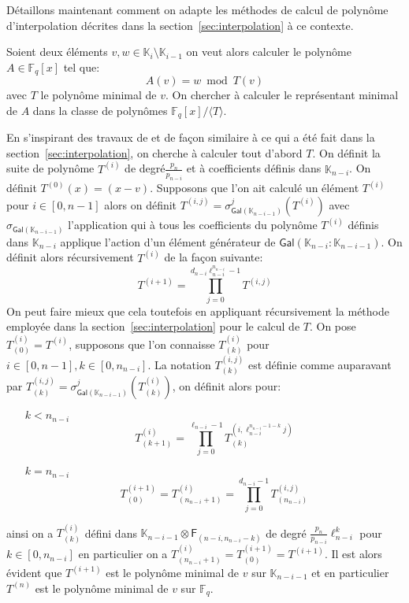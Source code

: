 \documentclass[10pt,a4paper]{book}
\theoremstyle{plain}
\theoremstyle{definition}
\theoremstyle{definition}
\theoremstyle{definition}
\theoremstyle{definition}
\theoremstyle{remark}
\theoremstyle{remark}
\theoremstyle{definition}
\begin{document}
Détaillons maintenant comment on adapte les méthodes de calcul de polynôme 
d'interpolation décrites dans la section~\ref{sec:interpolation} à ce contexte.
 
  
 Soient deux éléments $v,w \in \mathbb{K}_{i} \setminus \mathbb{K}_{i-1}$ on veut
 alors calculer le polynôme $A \in \mathbb{F}_q[x]$ tel que:
\begin{equation}
A(v)=w \bmod T(v)
\end{equation}
avec $T$ le polynôme minimal de $v$. On chercher à calculer le représentant 
minimal de $A$ dans la classe de polynômes $\mathbb{F}_q[x]/ \langle T \rangle$.

 
 En s'inspirant des travaux de \cite{DeFeo10} et de façon similaire à ce qui a 
 été fait dans la section~\ref{sec:interpolation}, on cherche à calculer tout 
 d'abord $T$. On définit la suite de polynôme $T^{(i)}$ de degré$\frac{p_n}{p_{n-i}}$ 
 et à coefficients définis dans $\mathbb{K}_{n-i}$. On définit $T^{(0)}(x)=(x-v)$. 
 Supposons que l'on ait calculé un élément $T^{(i)}$ pour $i \in [0,n-1]$ alors on définit 
 $T^{(i,j)}=\sigma^j_{\mathsf{Gal}(\mathbb{K}_{n-i-1})}(T^{(i)})$ avec
  $\sigma_{\mathsf{Gal}(\mathbb{K}_{n-i-1})}$ 
 l'application qui à tous les coefficients du polynôme $T^{(i)}$ définis dans 
 $\mathbb{K}_{n-i}$ applique l'action d'un élément générateur de 
 $\mathsf{Gal}(\mathbb{K}_{n-i}: \mathbb{K}_{n-i-1})$. 
 On définit alors récursivement $T^{(i)}$ de la façon suivante:
 \begin{equation*}
T^{(i+1)}=\prod_{j=0}^{d_{n-i}\ell_{n-i}^{n_{n-i}}-1}T^{(i,j)}    
\end{equation*}
On peut faire mieux que cela toutefois en appliquant récursivement la méthode 
employée dans la section~\ref{sec:interpolation} pour le calcul de $T$. On pose
$T^{(i)}_{(0)}=T^{(i)}$, supposons que l'on connaisse  $T^{(i)}_{(k)}$ pour 
$i \in [0,n-1], k \in [0,n_{n-i}]$. La notation $T^{(i,j)}_{(k)}$ est définie comme
 auparavant par $T^{(i,j)}_{(k)}=\sigma^j_{\mathsf{Gal}(\mathbb{K}_{n-i-1})}
 (T^{(i)}_{(k)})$, on définit alors pour:
\begin{itemize}
 \item[$k < n_{n-i}$ ]
 \[
T^{(i)}_{(k+1)}=\prod_{j=0}^{\ell_{n-i}-1}T^{(i,\ell_{n-i}^{n_{n-i}-1-k}j)}_{(k)}\]
\item[$k= n_{n-i}$]
\[
T^{(i+1)}_{(0)}=T^{(i)}_{(n_{n-i}+1)}=\prod_{j=0}^{d_{n-i}-1}T^{(i,j)}_{(n_{n-i})}
\]
\end{itemize}
ainsi on a $T^{(i)}_{(k)}$ défini dans $\mathbb{K}_{n-i-1} \otimes \mathsf{F}_{(n-i,n_{n-i}-k)}$
de degré $\frac{p_n}{p_{n-i}}\ell_{n-i}^{k}$ pour $k \in [0,n_{n-i}]$ en 
particulier on a $T^{(i)}_{(n_{n-i}+1)}=T^{(i+1)}_{(0)}=T^{(i+1)}$.  
Il est alors évident que $T^{(i+1)}$ est le polynôme minimal de $v$ sur 
$\mathbb{K}_{n-i-1}$ et en particulier $T^{(n)}$ est le polynôme minimal de $v$
sur $\mathbb{F}_q$.
\end{document}
